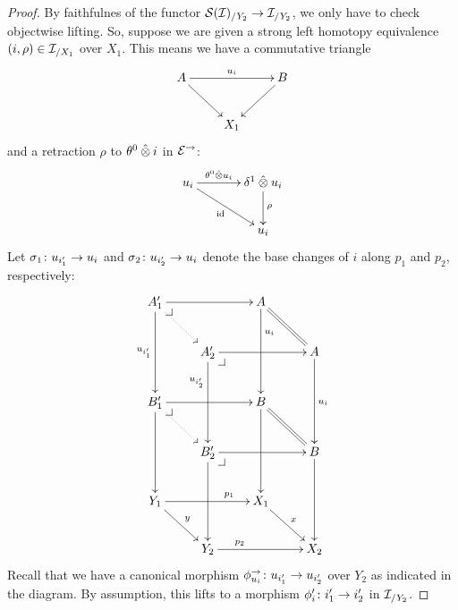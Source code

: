 \documentclass[reqno,10pt,a4paper,oneside]{amsart}
\begin{document}
\begin{proof}
By faithfulnes of the functor $\cal{S}(\cal{I})_{/Y_2} \to \cal{I}_{/Y_2}$, we only have to check objectwise lifting. So, 
suppose we are given a strong left homotopy equivalence $(i, \rho) \in \cal{I}_{/X_1}$ over $X_1$.
This means we have a commutative triangle
\[
\xymatrix{
  A
  \ar[rr]^{u_i}
  \ar[dr]
&&
  B
  \ar[dl]
\\&
  X_1
}
\]
and a retraction $\rho$ to $\thetal \hatotimes i$ in $\catE^{\to}$:
\[
\xymatrix@C+1em{
  u_i
  \ar[r]^-{\thetal \hatotimes u_i}
  \ar[dr]_{\id}
&
  \rcyl \hatotimes u_i \ar[d]^{\rho}
\\&
  u_i
}
\]
Let $\sigma_1 \co u_{i_1'} \to u_i$ and $\sigma_2 \co u_{i_2'} \to u_i$ denote the base changes of $i$ along $p_1$ and $p_2$, respectively:
\[
\xymatrix{
  A_1'
  \ar[rr]
  \ar[dd]_{u_{i_1'}}
  \pullback{dr}
  \ar@{.>}[dr]
&&
  A
  \ar[dd]^(0.3){u_i}
  \ar@{=}[dr]
\\&
  A_2'
  \ar[rr]
  \ar[dd]_(0.3){u_{i_2'}}
  \pullback{dr}
&&
  A
  \ar[dd]^{u_i}
\\
  B_1'
  \ar[rr]
  \ar[dd]
  \pullback{dr}
  \ar@{.>}[dr]
&&
  B
  \ar[dd]
  \ar@{=}[dr]
\\&
  B_2'
  \ar[rr]
  \ar[dd]
  \pullback{dr}
&&
  B
  \ar[dd]
\\
  Y_1
  \ar[rr]^(0.7){p_1}
  \ar[dr]^{y}
&&
  X_1
  \ar[dr]^{x}
\\&
  Y_2
  \ar[rr]^(0.3){p_2}
&&
  X_2
}
\]
Recall that we have a canonical morphism $\phi_{u_i}^{\to} \co u_{i_1'} \to u_{i_2'}$ over $Y_2$ as indicated in the diagram.
By assumption, this lifts to a morphism $\phi_i' \co i_1' \to i_2'$ in $\cal{I}_{/Y_2}$.


\end{proof}
\end{document}
